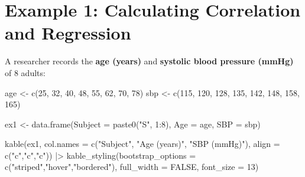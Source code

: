 \documentclass[
  12pt,
  letterpaper,
]{book}
\newenvironment{Shaded}{\begin{snugshade}}{\end{snugshade}}
\newcommand{\AttributeTok}[1]{\textcolor[rgb]{0.40,0.45,0.13}{#1}}
\newcommand{\ConstantTok}[1]{\textcolor[rgb]{0.56,0.35,0.01}{#1}}
\newcommand{\DecValTok}[1]{\textcolor[rgb]{0.68,0.00,0.00}{#1}}
\newcommand{\FunctionTok}[1]{\textcolor[rgb]{0.28,0.35,0.67}{#1}}
\newcommand{\NormalTok}[1]{\textcolor[rgb]{0.00,0.23,0.31}{#1}}
\newcommand{\OtherTok}[1]{\textcolor[rgb]{0.00,0.23,0.31}{#1}}
\newcommand{\SpecialCharTok}[1]{\textcolor[rgb]{0.37,0.37,0.37}{#1}}
\newcommand{\StringTok}[1]{\textcolor[rgb]{0.13,0.47,0.30}{#1}}
\begin{document}
\section{Example 1: Calculating Correlation and
Regression}\label{example-1-calculating-correlation-and-regression}

A researcher records the \textbf{age (years)} and \textbf{systolic blood
pressure (mmHg)} of 8 adults:

\begin{Shaded}
\begin{Highlighting}[]
\NormalTok{age }\OtherTok{\textless{}{-}} \FunctionTok{c}\NormalTok{(}\DecValTok{25}\NormalTok{, }\DecValTok{32}\NormalTok{, }\DecValTok{40}\NormalTok{, }\DecValTok{48}\NormalTok{, }\DecValTok{55}\NormalTok{, }\DecValTok{62}\NormalTok{, }\DecValTok{70}\NormalTok{, }\DecValTok{78}\NormalTok{)}
\NormalTok{sbp }\OtherTok{\textless{}{-}} \FunctionTok{c}\NormalTok{(}\DecValTok{115}\NormalTok{, }\DecValTok{120}\NormalTok{, }\DecValTok{128}\NormalTok{, }\DecValTok{135}\NormalTok{, }\DecValTok{142}\NormalTok{, }\DecValTok{148}\NormalTok{, }\DecValTok{158}\NormalTok{, }\DecValTok{165}\NormalTok{)}

\NormalTok{ex1 }\OtherTok{\textless{}{-}} \FunctionTok{data.frame}\NormalTok{(}\AttributeTok{Subject =} \FunctionTok{paste0}\NormalTok{(}\StringTok{"S"}\NormalTok{, }\DecValTok{1}\SpecialCharTok{:}\DecValTok{8}\NormalTok{), }\AttributeTok{Age =}\NormalTok{ age, }\AttributeTok{SBP =}\NormalTok{ sbp)}

\FunctionTok{kable}\NormalTok{(ex1, }\AttributeTok{col.names =} \FunctionTok{c}\NormalTok{(}\StringTok{"Subject"}\NormalTok{, }\StringTok{"Age (years)"}\NormalTok{, }\StringTok{"SBP (mmHg)"}\NormalTok{),}
      \AttributeTok{align =} \FunctionTok{c}\NormalTok{(}\StringTok{"c"}\NormalTok{,}\StringTok{"c"}\NormalTok{,}\StringTok{"c"}\NormalTok{)) }\SpecialCharTok{|\textgreater{}}
  \FunctionTok{kable\_styling}\NormalTok{(}\AttributeTok{bootstrap\_options =} \FunctionTok{c}\NormalTok{(}\StringTok{"striped"}\NormalTok{,}\StringTok{"hover"}\NormalTok{,}\StringTok{"bordered"}\NormalTok{),}
                \AttributeTok{full\_width =} \ConstantTok{FALSE}\NormalTok{, }\AttributeTok{font\_size =} \DecValTok{13}\NormalTok{)}
\end{Highlighting}
\end{Shaded}

\begingroup\fontsize{13}{15}\selectfont
\end{document}
